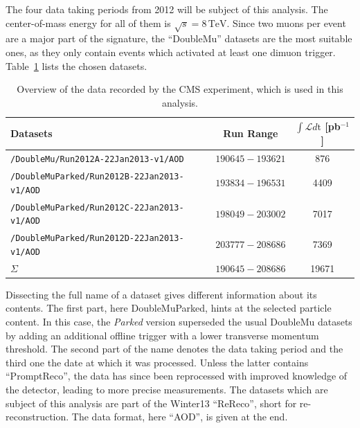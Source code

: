 The four data taking periods from 2012 will be subject of this analysis. The center-of-mass energy for all of them is $\sqrt{s} = 8\,\text{TeV}$. Since two muons per event are a major part of the signature, the ``DoubleMu'' datasets are the most suitable ones, as they only contain events which activated at least one dimuon trigger. Table~\ref{tab:data} lists the chosen datasets.

\begin{table}[!ht]
  \centering
  \begin{tabular}{|l|c|c|}
    \hline
    Datasets                                         & Run Range         & $\int \mathcal{L} d\text{t}$ [pb$^{-1}$] \\ \hline \hline
    \verb+/DoubleMu/Run2012A-22Jan2013-v1/AOD+\footnotemark       & $190645 - 193621$ & 876                            \\ \hline
    \verb+/DoubleMuParked/Run2012B-22Jan2013-v1/AOD+ & $193834 - 196531$ & 4409                           \\ \hline
    \verb+/DoubleMuParked/Run2012C-22Jan2013-v1/AOD+ & $198049 - 203002$ & 7017                           \\ \hline
    \verb+/DoubleMuParked/Run2012D-22Jan2013-v1/AOD+ & $203777 - 208686$ & 7369                           \\ \hline
    $\Sigma$                                         & $190645 - 208686$ & 19671                          \\ \hline
  \end{tabular}
  \caption{Overview of the data recorded by the CMS experiment, which is used in this analysis.}
  \label{tab:data}
\end{table}


Dissecting the full name of a dataset gives different information about its contents. The first part, here DoubleMuParked, hints at the selected particle content. In this case, the \textit{Parked} version superseded the usual DoubleMu datasets by adding an additional offline trigger with a lower transverse momentum threshold. The second part of the name denotes the data taking period and the third one the date at which it was processed. Unless the latter contains ``PromptReco'', the data has since been reprocessed with improved knowledge of the detector, leading to more precise measurements. The datasets which are subject of this analysis are part of the Winter13 ``ReReco'', short for re-reconstruction. The data format, here ``AOD'', is given at the end.

